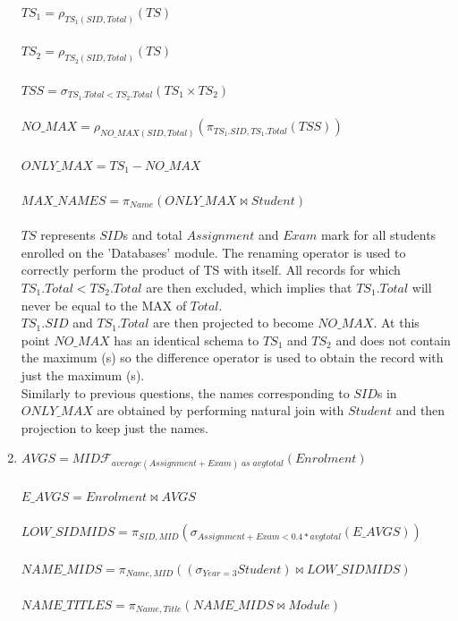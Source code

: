 \documentclass[a4paper]{article}
\begin{document}
\begin{enumerate}
        $  TS_1 = \rho_{TS_1(SID,Total)} (TS) $ \\ \\
        $  TS_2 = \rho_{TS_2(SID,Total)} (TS) $ \\ \\
        $  TSS = \sigma_{TS_1.Total < TS_2.Total} (TS_1 \times TS_2) $ \\ \\
        $  NO\_MAX = \rho_{NO\_MAX(SID,Total)} (\pi_{TS_1.SID,TS_1.Total} (TSS)) $ \\ \\
        $  ONLY\_MAX = TS_1 - NO\_MAX $ \\ \\
        $  MAX\_NAMES = \pi_{Name} (ONLY\_MAX \Join Student) $ \\ \\
        $TS$ represents $SID$s and total $Assignment$ and $Exam$ mark for all students 
        enrolled on the 'Databases' module.
        The renaming operator is used to correctly perform the product of TS with itself.
        All records for which $TS_1.Total < TS_2.Total$ are then excluded, which implies that
        $TS_1.Total$ will never be equal to the MAX of $Total$. \\
        $TS_1.SID$ and $TS_1.Total$ are then projected to become $NO\_MAX$. At this point 
        $NO\_MAX$ has an identical schema to $TS_1$ and $TS_2$ and does not contain the maximum (s)
        so the difference operator is used to obtain the record with just the maximum (s). \\
        Similarly to previous questions, the names corresponding to $SID$s in $ONLY\_MAX$ 
        are obtained by performing natural join with $Student$ and then projection to keep
        just the names.
    \item $ AVGS = MID \mathcal{F}_{average(Assignment + Exam)\; as\; avgtotal} (Enrolment) $ \\ \\
        $ E\_AVGS = Enrolment \Join AVGS $ \\ \\
        $ LOW\_SIDMIDS = \pi_{SID,MID} (\sigma_{Assignment + Exam < 0.4*avgtotal} (E\_AVGS)) $ \\ \\
        $ NAME\_MIDS = \pi_{Name,MID} ((\sigma_{Year = 3} Student) \Join LOW\_SIDMIDS ) $ \\ \\
        $ NAME\_TITLES = \pi_{Name,Title} (NAME\_MIDS \Join Module) $ \\ \\

\end{enumerate}
\end{document}
